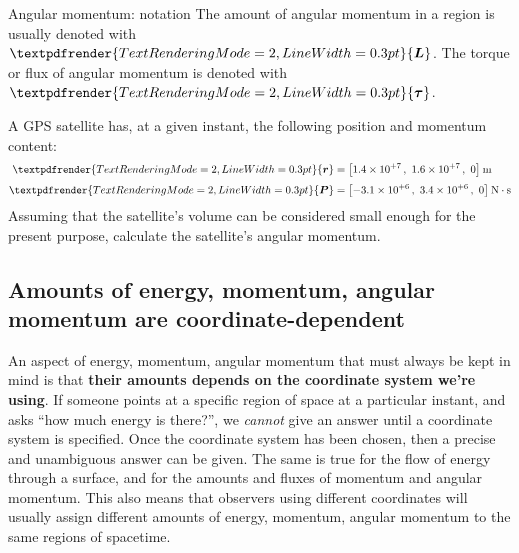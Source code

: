 \documentclass[a4paper,12pt,%
onecolumn,oneside,titlepage,%
british%
]{memoir}
\renewcommand*{\bm}[1]{\textpdfrender{TextRenderingMode=2,LineWidth=0.3pt}{\boldsymbol{#1}}}
\renewcommand*{\|}[1][]{\nonscript\:#1\vert\nonscript\:\mathopen{}}
\newcommand*{\yr}{\bm{r}}
\newcommand*{\yP}{\bm{P}}
\newcommand*{\yL}{\bm{L}}%
\newcommand*{\yto}{\bm{\tau}}%
\begin{document}
\smallskip

\begin{definition}{Angular momentum: notation}
  The amount of angular momentum in a region is usually denoted with $\yL$. The torque or flux of angular momentum is denoted with $\yto$.
\end{definition}




\begin{exercise}
  A GPS satellite has, at a given instant, the following position and momentum content:
  \begin{equation*}
    \begin{split}
      \yr &=\bigl[
      \num[exponent-mode=scientific]{1.4e+7}\,,\
      \num[exponent-mode=scientific]{1.6e+7}\,,\
      0\bigr]\:\unit{m}
      \\[\jot]
      \yP &=\bigl[
      \num[exponent-mode=scientific]{-3.1e+6}\,,\
      \num[exponent-mode=scientific]{3.4e+6}\,,\
      0\bigr]\:\unit{N\cdot s}
    \end{split}
  \end{equation*}
  Assuming that the satellite's volume can be considered small enough for the present purpose, calculate the satellite's angular momentum.
\end{exercise}



\subsection{Amounts of energy, momentum, angular momentum are coordinate-dependent}
\label{sec:energy_momentum_angmomentum_coords}


An aspect of energy, momentum, angular momentum that must always be kept in mind is that \textbf{their amounts depends on the coordinate system we're using}. If someone points at a specific region of space at a particular instant, and asks \enquote{how much energy is there?}, we \emph{cannot} give an answer until a coordinate system is specified. Once the coordinate system has been chosen, then a precise and unambiguous answer can be given. The same is true for the flow of energy through a surface, and for the amounts and fluxes of momentum and angular momentum. This also means that observers using different coordinates will usually assign different amounts of energy, momentum, angular momentum to the same regions of spacetime.
\end{document}
